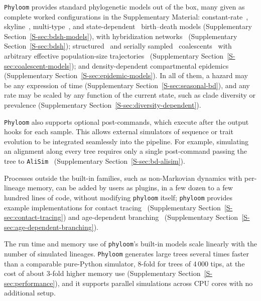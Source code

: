 \documentclass[11pt]{article}
\begin{document}
\texttt{Phyloom} provides standard phylogenetic models out of the box, many
given as complete worked configurations in the Supplementary Material:
constant-rate~\citep{stadler2010sampling}, skyline~\citep{stadler2013bdsky},
multi-type~\citep{kuhnert2016bdmm}, and
state-dependent~\citep{maddison2007bisse} birth--death models
(Supplementary Section~\ref{S-sec:bdsh-models}), with hybridization
networks~\citep{justison2023siphynetwork} (Supplementary
Section~\ref{S-sec:bdsh}); structured~\citep{notohara1990coalescent} and
serially sampled~\citep{drummond2002serial}
coalescents~\citep{kingman1982coalescent} with arbitrary effective
population-size trajectories~\citep{griffiths1994varying} (Supplementary
Section~\ref{S-sec:coalescent-models}); and density-dependent
compartmental epidemics~\citep{kermack1927contribution} (Supplementary
Section~\ref{S-sec:epidemic-models}). In all of them, a hazard may be any expression of
time (Supplementary Section~\ref{S-sec:seasonal-bd}), and any rate may be scaled
by any function of the current state, such as clade diversity or prevalence
(Supplementary Section~\ref{S-sec:diversity-dependent}).

\texttt{Phyloom} also supports optional post-commands, which execute after the
output hooks for each sample. This allows external simulators of sequence or
trait evolution to be integrated seamlessly into the pipeline. For example,
simulating an alignment along every tree requires only a single post-command
passing the tree to \texttt{AliSim}~\citep{lytrong2022alisim}
(Supplementary Section~\ref{S-sec:bd-alisim}).

Processes outside the built-in families, such as non-Markovian dynamics
with per-lineage memory, can be added by users as plugins, in a few dozen
to a few hundred lines of code, without modifying \texttt{phyloom} itself;
\texttt{phyloom} provides example implementations for contact
tracing~\citep{zhukova2025contact} (Supplementary Section~\ref{S-sec:contact-tracing}) and
age-dependent branching~\citep{harris1963theory}
(Supplementary Section~\ref{S-sec:age-dependent-branching}).

The run time and memory use of \texttt{phyloom}'s built-in models scale
linearly with the number of simulated lineages. \texttt{Phyloom} generates
large trees several times faster than a comparable pure-Python simulator,
8-fold for trees of 4\,000 tips, at the cost of about 3-fold higher
memory use (Supplementary Section~\ref{S-sec:performance}), and it
supports parallel simulations across CPU cores with no additional setup.
\end{document}
